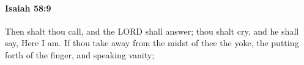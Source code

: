 
		\paragraph{Isaiah 58:9} %
			\label{ISAIAH-58-9}

			Then shalt thou call, and the LORD shall answer; thou shalt cry, and he shall say, Here I am. If thou take away from the midst of thee the yoke, the putting forth of the finger, and speaking vanity;


